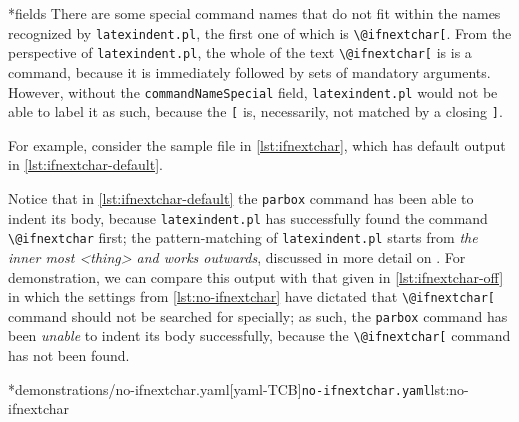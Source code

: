*{fields} There are some special command names%
	 that do not fit within the names recognized by \texttt{latexindent.pl}, the first one of which is \lstinline!\@ifnextchar[!.
	From the perspective of \texttt{latexindent.pl}, the whole of the text \lstinline!\@ifnextchar[! is is a command, because it is immediately followed by sets of mandatory arguments.
	However, without the \texttt{commandNameSpecial} field, \texttt{latexindent.pl} would not be able to label it as such, because the \lstinline![! is, necessarily, not matched by a closing \lstinline!]!.

	For example, consider the sample file in \cref{lst:ifnextchar}, which has default output in \cref{lst:ifnextchar-default}.

	\begin{minipage}{.45\textwidth}
	\end{minipage}
	\hfill
	\begin{minipage}{.45\textwidth}
	\end{minipage}

	Notice that in \cref{lst:ifnextchar-default} the \texttt{parbox} command has been able to indent its body, because \texttt{latexindent.pl} has successfully found the command \lstinline!\@ifnextchar! first; the pattern-matching of \texttt{latexindent.pl} starts from \emph{the inner most <thing> and works outwards}, discussed in more detail on .
	For demonstration, we can compare this output with that given in \cref{lst:ifnextchar-off} in which the settings from \cref{lst:no-ifnextchar} have dictated that \lstinline!\@ifnextchar[! command should not be searched for specially; as such, the \texttt{parbox} command has been \emph{unable} to indent its body successfully, because the \lstinline!\@ifnextchar[! command has not been found.

	\begin{minipage}{.45\textwidth}
	\end{minipage}
	\hfill
	\begin{minipage}{.45\textwidth}
		\cmhlistingsfromfile[style=yaml-LST]*{demonstrations/no-ifnextchar.yaml}[yaml-TCB]{\texttt{no-ifnextchar.yaml}}{lst:no-ifnextchar}
	\end{minipage}
